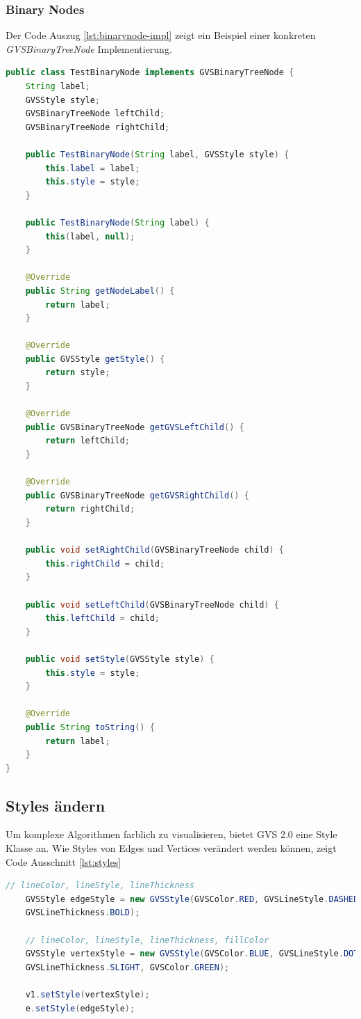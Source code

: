 \documentclass[11pt,a4paper,english,oneside]{book}
\numberwithin{equation}{chapter}
\begin{document}
	\subsubsection{Binary Nodes}
	Der Code Auszug \ref{lst:binarynode-impl} zeigt ein Beispiel einer konkreten \textit{GVSBinaryTreeNode} Implementierung.

\begin{lstlisting}[language=java, frame=single, caption={Binary Node Implementierung}, label={lst:binarynode-impl}]
public class TestBinaryNode implements GVSBinaryTreeNode {
	String label;
	GVSStyle style;
	GVSBinaryTreeNode leftChild;
	GVSBinaryTreeNode rightChild;
	
	public TestBinaryNode(String label, GVSStyle style) {
		this.label = label;
		this.style = style;
	}
	
	public TestBinaryNode(String label) {
		this(label, null);
	}
	
	@Override
	public String getNodeLabel() {
		return label;
	}
	
	@Override
	public GVSStyle getStyle() {
		return style;
	}
	
	@Override
	public GVSBinaryTreeNode getGVSLeftChild() {
		return leftChild;
	}
	
	@Override
	public GVSBinaryTreeNode getGVSRightChild() {
		return rightChild;
	}
	
	public void setRightChild(GVSBinaryTreeNode child) {
		this.rightChild = child;
	}
	
	public void setLeftChild(GVSBinaryTreeNode child) {
		this.leftChild = child;
	}
	
	public void setStyle(GVSStyle style) {
		this.style = style;
	}
	
	@Override
	public String toString() {
		return label;
	}
}
\end{lstlisting}

	\clearpage
	
	\subsection{Styles ändern}
	Um komplexe Algorithmen farblich zu visualisieren, bietet GVS 2.0 eine Style Klasse an. Wie Styles von Edges und Vertices verändert werden können, zeigt Code Ausschnitt \ref{lst:styles}
	
	\begin{lstlisting}[language=java, frame=single, caption={Styles verändern}, label={lst:styles}]
	// lineColor, lineStyle, lineThickness
	GVSStyle edgeStyle = new GVSStyle(GVSColor.RED, GVSLineStyle.DASHED,
	GVSLineThickness.BOLD);
	
	// lineColor, lineStyle, lineThickness, fillColor
	GVSStyle vertexStyle = new GVSStyle(GVSColor.BLUE, GVSLineStyle.DOTTED,
	GVSLineThickness.SLIGHT, GVSColor.GREEN);
	
	v1.setStyle(vertexStyle);
	e.setStyle(edgeStyle);
	\end{lstlisting}
	
\end{document}
